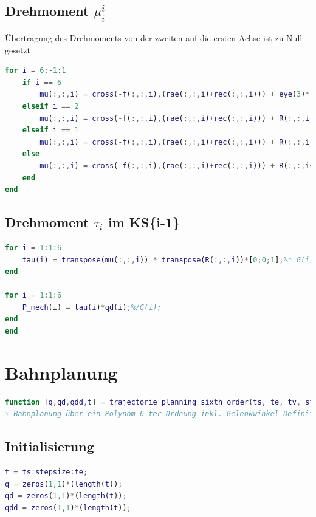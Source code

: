 \subsection{Drehmoment $\mu^{i}_i$}
Übertragung des Drehmoments von der zweiten auf die ersten Achse ist zu Null gesetzt
\begin{lstlisting}[language=Matlab, numbers=none]
for i = 6:-1:1
	if i == 6
		mu(:,:,i) = cross(-f(:,:,i),(rae(:,:,i)+rec(:,:,i))) + eye(3)*[0;0;0] + eye(3)*cross([0;0;0], rec(:,:,i)) + I(:,:,i)*omega_d(:,:,i) + cross(omega(:,:,i),(I(:,:,i)*omega(:,:,i)));
	elseif i == 2
		mu(:,:,i) = cross(-f(:,:,i),(rae(:,:,i)+rec(:,:,i))) + R(:,:,i+1)*mu(:,:,i+1) + R(:,:,i+1)*cross(f(:,:,i+1), rec(:,:,i)) + I(:,:,i)*omega_d(:,:,i) + 	cross(omega(:,:,i),(I(:,:,i)*omega(:,:,i)))- mugrav(:,:,i);
	elseif i == 1
		mu(:,:,i) = cross(-f(:,:,i),(rae(:,:,i)+rec(:,:,i))) + R(:,:,i+1)*cross(f(:,:,i+1), rec(:,:,i)) + I(:,:,i)*omega_d(:,:,i) + 	cross(omega(:,:,i),(I(:,:,i)*omega(:,:,i)));
	else
		mu(:,:,i) = cross(-f(:,:,i),(rae(:,:,i)+rec(:,:,i))) + R(:,:,i+1)*mu(:,:,i+1) + R(:,:,i+1)*cross(f(:,:,i+1), rec(:,:,i)) + I(:,:,i)*omega_d(:,:,i) + 	cross(omega(:,:,i),(I(:,:,i)*omega(:,:,i)));
	end
end
\end{lstlisting}
%
\subsection{Drehmoment $\tau_i$ im KS\{i-1\}}
%
\begin{lstlisting}[language=Matlab, numbers=none]
for i = 1:1:6
	tau(i) = transpose(mu(:,:,i)) * transpose(R(:,:,i))*[0;0;1];%* G(i)
end

for i = 1:1:6
	P_mech(i) = tau(i)*qd(i);%/G(i);
end
end
\end{lstlisting}
\setcounter{section}{3}
\section{Bahnplanung}
\label{add:traj}
%
\begin{lstlisting}[language=Matlab, numbers=none]
function [q,qd,qdd,t] = trajectorie_planning_sixth_order(ts, te, tv, stepsize, qs, qds, qdds, qv, qe, qde, qdde)
% Bahnplanung über ein Polynom 6-ter Ordnung inkl. Gelenkwinkel-Definition des Via-P\dfrac
\end{lstlisting}
%
\subsection{Initialisierung}
%
\begin{lstlisting}[language=Matlab, numbers=none]
t = ts:stepsize:te;
q = zeros(1,1)*(length(t));
qd = zeros(1,1)*(length(t));
qdd = zeros(1,1)*(length(t));
\end{lstlisting}
%

